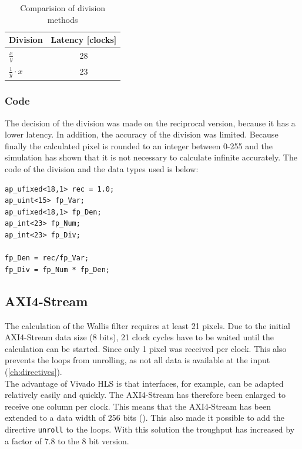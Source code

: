 \begin{table}[tb!]
    \centering
    \begin{tabular}{l c}
        \toprule
        Division & Latency [clocks]  \\
        \midrule
        $\frac{x}{y}$ & 28 
        \\
        $\frac{1}{y} \cdot x$ & 23 
        \\
        \bottomrule
    \end{tabular}
    \caption{Comparision of division methods}
    \label{tab:c_div}
\end{table}

\subsubsection*{Code}
The decision of the division was made on the reciprocal version, because it has a lower latency. In addition, the accuracy of the division was limited. Because finally the calculated pixel is rounded to an integer between 0-255 and the simulation has shown that it is not necessary to calculate infinite accurately. The code of the division and the data types used is below:

\begin{minipage}{\textwidth}
\begin{lstlisting}[style=CStyle, caption=Calculation of the division for the Wallis filter, label=lst:division]
ap_ufixed<18,1> rec = 1.0;
ap_uint<15> fp_Var;
ap_ufixed<18,1> fp_Den;
ap_int<23> fp_Num;
ap_int<23> fp_Div;

fp_Den = rec/fp_Var;
fp_Div = fp_Num * fp_Den;
\end{lstlisting}
\end{minipage}


\subsection{AXI4-Stream} \label{ch:ip:axi}
The calculation of the Wallis filter requires at least 21 pixels. Due to the initial AXI4-Stream data size (8 bits), 21 clock cycles have to be waited until the calculation can be started. Since only 1 pixel was received per clock. This also prevents the loops from unrolling, as not all data is available at the input (\ref{ch:directives}). \\
The advantage of Vivado HLS is that interfaces, for example, can be adapted relatively easily and quickly. The AXI4-Stream has therefore been enlarged to receive one column per clock. This means that the AXI4-Stream has been extended to a data width of 256 bits (\cite{axi_stream}). This also made it possible to add the directive \texttt{unroll} to the loops. With this solution the troughput has increased by a factor of 7.8 to the 8 bit version.

